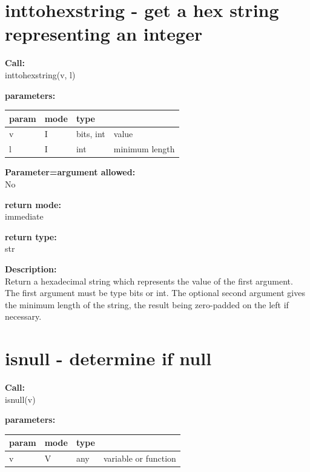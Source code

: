     \section{inttohexstring - get a hex string representing an integer}\label{sec:ifinttohexstring}
        
        {\bf Call:} \\
        inttohexstring(v, l)
        
        {\bf parameters:} \\
        \begin{tabular}{| l | l | l | l |}
        \hline
        param  & mode & type & \\
        \hline \hline
        v & I & bits, int & value           \\ \hline
        l & I & int       & minimum length  \\ \hline
        \end{tabular}
        
        {\bf Parameter=argument allowed:} \\
        No
        
        {\bf return mode:} \\
        immediate

        {\bf return type:} \\
        str
        
        {\bf Description:} \\
        Return a hexadecimal string which represents the value of the first
        argument. The first argument must be type bits or int. The optional
        second argument gives the minimum length of the string, the result being
        zero-padded on the left if necessary.
       

    \section{isnull - determine if null}\label{sec:ifisnull}
        
        {\bf Call:} \\
        isnull(v)
        
        {\bf parameters:} \\
        \begin{tabular}{| l | l | l | l |}
        \hline
        param  & mode & type & \\
        \hline \hline
        v & V & any & variable or function \\ \hline
        \end{tabular}
        
